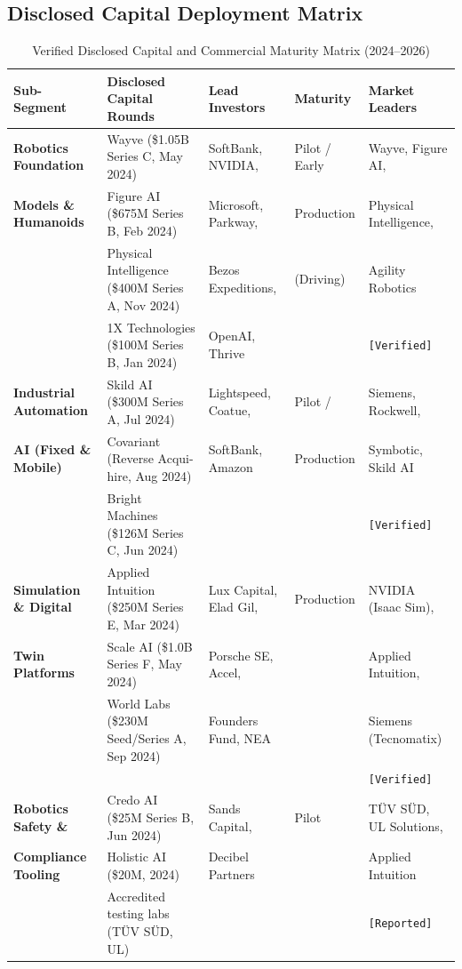 \documentclass[11pt,a4paper]{article}
\begin{document}
\subsection{Disclosed Capital Deployment Matrix}
\begin{table}[h!]
\centering
\small
\begin{tabularx}{\textwidth}{@{}l p{4.4cm} p{3.4cm} l X@{}}
\toprule
\textbf{Sub-Segment} & \textbf{Disclosed Capital Rounds} & \textbf{Lead Investors} & \textbf{Maturity} & \textbf{Market Leaders} \\
\midrule
\textbf{Robotics Foundation} & Wayve (\$1.05B Series C, May 2024)\newline & SoftBank, NVIDIA, & Pilot / Early & Wayve, Figure AI, \\
\textbf{Models \& Humanoids} & Figure AI (\$675M Series B, Feb 2024)\newline & Microsoft, Parkway, & Production & Physical Intelligence, \\
& Physical Intelligence (\$400M Series A, Nov 2024)\newline & Bezos Expeditions, & (Driving) & Agility Robotics \\
& 1X Technologies (\$100M Series B, Jan 2024) & OpenAI, Thrive & & \texttt{[Verified]} \\
\addlinespace
\textbf{Industrial Automation} & Skild AI (\$300M Series A, Jul 2024)\newline & Lightspeed, Coatue, & Pilot / & Siemens, Rockwell, \\
\textbf{AI (Fixed \& Mobile)} & Covariant (Reverse Acqui-hire, Aug 2024)\newline & SoftBank, Amazon & Production & Symbotic, Skild AI \\
& Bright Machines (\$126M Series C, Jun 2024) & & & \texttt{[Verified]} \\
\addlinespace
\textbf{Simulation \& Digital} & Applied Intuition (\$250M Series E, Mar 2024)\newline & Lux Capital, Elad Gil, & Production & NVIDIA (Isaac Sim), \\
\textbf{Twin Platforms} & Scale AI (\$1.0B Series F, May 2024)\newline & Porsche SE, Accel, & & Applied Intuition, \\
& World Labs (\$230M Seed/Series A, Sep 2024) & Founders Fund, NEA & & Siemens (Tecnomatix) \\
& & & & \texttt{[Verified]} \\
\addlinespace
\textbf{Robotics Safety \&} & Credo AI (\$25M Series B, Jun 2024)\newline & Sands Capital, & Pilot & TÜV SÜD, UL Solutions, \\
\textbf{Compliance Tooling} & Holistic AI (\$20M, 2024)\newline & Decibel Partners & & Applied Intuition \\
& Accredited testing labs (TÜV SÜD, UL) & & & \texttt{[Reported]} \\
\bottomrule
\end{tabularx}
\caption{Verified Disclosed Capital and Commercial Maturity Matrix (2024--2026)}
\end{table}
\end{document}
